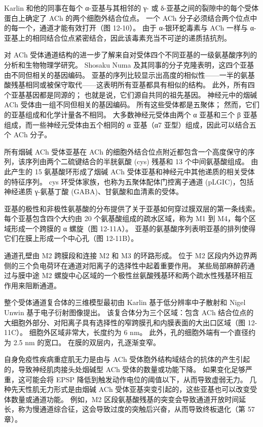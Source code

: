 Karlin 和他的同事在每个 α-亚基与其相邻的 γ- 或 δ-亚基之间的裂隙中的每个受体蛋白上确定了 ACh 的两个细胞外结合位点。 一个 ACh 分子必须结合两个位点中的每一个，通道才能有效打开（图 12-10）。 由于 α-银环蛇毒素与 ACh 一样与 α-亚基上的相同结合位点紧密结合，因此该毒素充当不可逆的递质拮抗剂。

对 ACh 受体通道结构的进一步了解来自对受体四个不同亚基的一级氨基酸序列的分析和生物物理学研究。 Shosaku Numa 及其同事的分子克隆表明，这四个亚基由不同但相关的基因编码。 亚基的序列比较显示出高度的相似性——一半的氨基酸残基相同或被保守取代——这表明所有亚基都具有相似的结构。 此外，所有四个亚基基因都是同源的； 也就是说，它们源自共同的祖先基因。 神经元中的烟碱 ACh 受体由一组不同但相关的基因编码。 所有这些受体都是五聚体； 然而，它们的亚基组成和化学计量各不相同。 大多数神经元受体由两个 α 亚基和三个 β 亚基组成，而一些神经元受体由五个相同的 α 亚基（α7 亚型）组成，因此可以结合五个 ACh 分子。

所有烟碱 ACh 受体亚基在 ACh 的细胞外结合位点附近都包含一个高度保守的序列，该序列由两个二硫键结合的半胱氨酸 (cys) 残基和 13 个中间氨基酸组成。 由此产生的 15 氨基酸环形成了烟碱 ACh 受体亚基和神经元中其他递质的相关受体的特征序列。 cys 环受体家族，也称为五聚体配体门控离子通道 (pLGIC)，包括神经递质 γ-氨基丁酸 (GABA)、甘氨酸和血清素的受体。

亚基的极性和非极性氨基酸的分布提供了关于亚基如何穿过膜双层的第一条线索。 每个亚基包含四个大约由 20 个氨基酸组成的疏水区域，称为 M1 到 M4，每个区域形成一个跨膜的 α 螺旋（图 12-11A）。 亚基的氨基酸序列表明亚基的排列使得它们在膜上形成一个中心孔（图 12-11B）。

通道孔壁由 M2 跨膜段和连接 M2 和 M3 的环路形成。 位于 M2 区段内外边界两侧的三个负电荷环在通道对阳离子的选择性中起着重要作用。 某些局部麻醉药通过与膜中途 M2 螺旋中心区域的一个极性丝氨酸残基环和两个疏水性残基环相互作用来阻断通道。

整个受体通道复合体的三维模型最初由 Karlin 基于低分辨率中子散射和 Nigel Unwin 基于电子衍射图像提出。 该复合体分为三个区域：包含 ACh 结合位点的大细胞外部分、对阳离子具有选择性的窄跨膜孔和内膜表面的大出口区域（图 12-11C）。 细胞外区域非常大，长度约为 6 nm。 此外，孔的细胞外端有一个直径约为 2.5 nm 的宽口。 在膜的双层内，孔逐渐变窄。

自身免疫性疾病重症肌无力是由与 ACh 受体胞外结构域结合的抗体的产生引起的，导致神经肌肉接头处烟碱型 ACh 受体的数量或功能下降。 如果变化足够严重，这可能会将 EPSP 降低到触发动作电位的阈值以下，从而导致虚弱无力。 几种先天性肌无力形式是由烟碱 ACh 受体亚基突变引起的，这些亚基也可以改变受体数量或通道功能。 例如，M2 区段氨基酸残基的突变会导致通道开放时间延长，称为慢通道综合征，这会导致过度的突触后兴奋，从而导致终板退化（第 57 章）。



